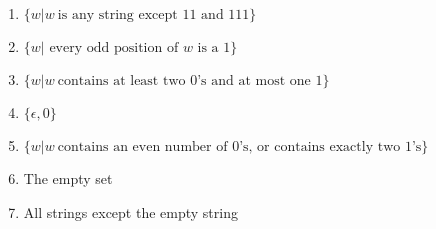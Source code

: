 \begin{enumerate}
\begin{enumerate}
              \item $\{w|w~ \text{is any string except }11\text{ and }111\}$
              \item $\{w|\text{ every odd position of }w\text{ is a }1\}$
              \item $\{w|w~ \text{contains at least two }0\text{'s and at most one }1\}$
              \item $\{\epsilon,0\}$
              \item $\{w|w~ \text{contains an even number of }0\text{'s, or contains exactly two }1\text{'s}\}$
              \item The empty set
              \item All strings except the empty string
          \end{enumerate}


\end{enumerate}

